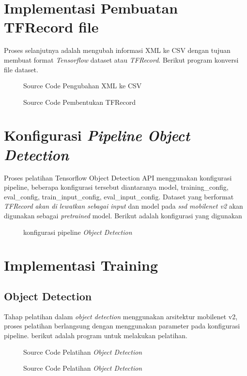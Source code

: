 \section{Implementasi Pembuatan TFRecord file}
Proses selanjutnya adalah mengubah informasi XML ke CSV dengan tujuan membuat format \textit{Tensorflow} dataset atau \textit{TFRecord}. Berikut program konversi file dataset.
\begin{figure}[H]
	\centering
	
	\caption{Source Code Pengubahan XML ke CSV}
\end{figure}
\begin{figure}[H]
	\centering
	
\end{figure}
\begin{figure}[H]
	\centering
	
	\caption{Source Code Pembentukan TFRecord}
\end{figure}
\section{Konfigurasi \textit{Pipeline Object Detection}}
Proses pelatihan Tensorflow Object Detection API  menggunakan konfigurasi pipeline, beberapa konfigurasi tersebut diantaranya model, training\_config, eval\_config, train\_input\_config, eval\_input\_config. Dataset yang berformat \textit{TFRecord akan di lewatkan sebagai input} dan model pada \textit{ssd mobilenet v2} akan digunakan sebagai \textit{pretrained} model. Berikut adalah konfigurasi yang digunakan
\begin{figure}[H]
	\centering
	
\end{figure}
\begin{figure}[H]
	\centering
	
	\caption{konfigurasi pipeline \textit{Object Detection}}
\end{figure}
\section{Implementasi Training}
\subsection{Object Detection}
Tahap pelatihan dalam \textit{object detection} menggunakan arsitektur mobilenet v2, proses pelatihan berlangsung dengan menggunakan parameter pada konfigurasi pipeline. berikut adalah program untuk melakukan pelatihan.
\begin{figure}[H]
	\centering
	
	\caption{Source Code Pelatihan \textit{Object Detection}}
\end{figure}
\begin{figure}[H]
	\centering
	
	\caption{Source Code Pelatihan \textit{Object Detection}}
\end{figure}
